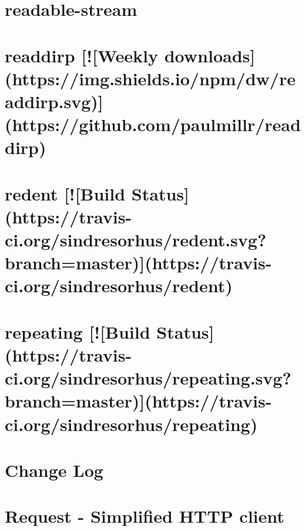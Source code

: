 \documentclass[twoside]{book}
\newcommand{\+}{\discretionary{\mbox{\scriptsize$\hookleftarrow$}}{}{}}
\begin{document}
\chapter{readable-\/stream}
\label{md_dsmacc_examples_DRmerge_node_modules_readable-stream_README}

\chapter{readdirp \mbox{[}!\mbox{[}Weekly downloads\mbox{]}(https\+://img.shields.\+io/npm/dw/readdirp.svg)\mbox{]}(https\+://github.com/paulmillr/readdirp)}
\label{md_dsmacc_examples_DRmerge_node_modules_readdirp_README}

\chapter{redent \mbox{[}!\mbox{[}Build Status\mbox{]}(https\+://travis-\/ci.org/sindresorhus/redent.svg?branch=master)\mbox{]}(https\+://travis-\/ci.org/sindresorhus/redent)}
\label{md_dsmacc_examples_DRmerge_node_modules_redent_readme}

\chapter{repeating \mbox{[}!\mbox{[}Build Status\mbox{]}(https\+://travis-\/ci.org/sindresorhus/repeating.svg?branch=master)\mbox{]}(https\+://travis-\/ci.org/sindresorhus/repeating)}
\label{md_dsmacc_examples_DRmerge_node_modules_repeating_readme}

\chapter{Change Log}
\label{md_dsmacc_examples_DRmerge_node_modules_request_CHANGELOG}

\chapter{Request -\/ Simplified H\+T\+TP client}
\label{md_dsmacc_examples_DRmerge_node_modules_request_README}

\end{document}

